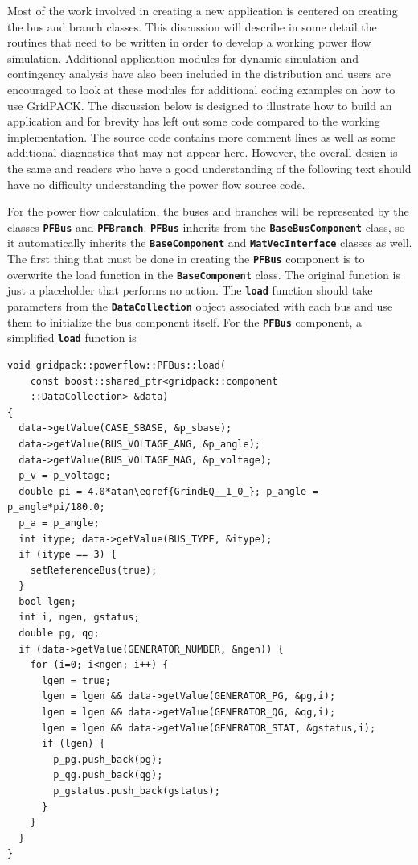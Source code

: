 Most of the work involved in creating a new application is centered on creating the bus and branch classes. This discussion will describe in some detail the routines that need to be written in order to develop a working power flow simulation. Additional application modules for dynamic simulation and contingency analysis have also been included in the distribution and users are encouraged to look at these modules for additional coding examples on how to use GridPACK. The discussion below is designed to illustrate how to build an application and for brevity has left out some code compared to the working implementation. The source code contains more comment lines as well as some additional diagnostics that may not appear here. However, the overall design is the same and readers who have a good understanding of the following text should have no difficulty understanding the power flow source code.

For the power flow calculation, the buses and branches will be represented by the classes \texttt{\textbf{PFBus}} and \texttt{\textbf{PFBranch}}. \texttt{\textbf{PFBus}} inherits from the \texttt{\textbf{BaseBusComponent}} class, so it automatically inherits the \texttt{\textbf{BaseComponent}} and \texttt{\textbf{MatVecInterface}} classes as well. The first thing that must be done in creating the \texttt{\textbf{PFBus}} component is to overwrite the load function in the \texttt{\textbf{BaseComponent}} class. The original function is just a placeholder that performs no action. The \texttt{\textbf{load}} function should take parameters from the \texttt{\textbf{DataCollection}} object associated with each bus and use them to initialize the bus component itself. For the \texttt{\textbf{PFBus}} component, a simplified \texttt{\textbf{load}} function is

{
\color{red}
\begin{Verbatim}[fontseries=b]
void gridpack::powerflow::PFBus::load(
    const boost::shared_ptr<gridpack::component
    ::DataCollection> &data)
{
  data->getValue(CASE_SBASE, &p_sbase);
  data->getValue(BUS_VOLTAGE_ANG, &p_angle);
  data->getValue(BUS_VOLTAGE_MAG, &p_voltage);
  p_v = p_voltage;
  double pi = 4.0*atan\eqref{GrindEQ__1_0_}; p_angle = p_angle*pi/180.0;
  p_a = p_angle;
  int itype; data->getValue(BUS_TYPE, &itype);
  if (itype == 3) {
    setReferenceBus(true);
  }
  bool lgen;
  int i, ngen, gstatus;
  double pg, qg;
  if (data->getValue(GENERATOR_NUMBER, &ngen)) {
    for (i=0; i<ngen; i++) {
      lgen = true;
      lgen = lgen && data->getValue(GENERATOR_PG, &pg,i);
      lgen = lgen && data->getValue(GENERATOR_QG, &qg,i);
      lgen = lgen && data->getValue(GENERATOR_STAT, &gstatus,i);
      if (lgen) {
        p_pg.push_back(pg);
        p_qg.push_back(qg);
        p_gstatus.push_back(gstatus);
      }
    }
  }
}
\end{Verbatim}
}

